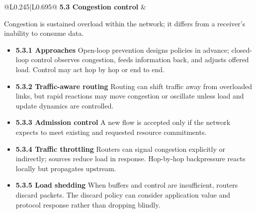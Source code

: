 \documentclass[10pt,letterpaper]{article}
\begin{document}
\begin{longtable}{@{}L{0.245\textwidth}|L{0.695\textwidth}@{}}
\textbf{5.3 Congestion control} & \begin{minipage}[t]{\linewidth}\raggedright Congestion is sustained overload within the network; it differs from a receiver's inability to consume data.\par\begin{itemize}\item \textbf{5.3.1 Approaches} Open-loop prevention designs policies in advance; closed-loop control observes congestion, feeds information back, and adjusts offered load. Control may act hop by hop or end to end.\item \textbf{5.3.2 Traffic-aware routing} Routing can shift traffic away from overloaded links, but rapid reactions may move congestion or oscillate unless load and update dynamics are controlled.\item \textbf{5.3.3 Admission control} A new flow is accepted only if the network expects to meet existing and requested resource commitments.\item \textbf{5.3.4 Traffic throttling} Routers can signal congestion explicitly or indirectly; sources reduce load in response. Hop-by-hop backpressure reacts locally but propagates upstream.\item \textbf{5.3.5 Load shedding} When buffers and control are insufficient, routers discard packets. The discard policy can consider application value and protocol response rather than dropping blindly.\end{itemize}\end{minipage} \\ \hline

\end{longtable}
\end{document}

